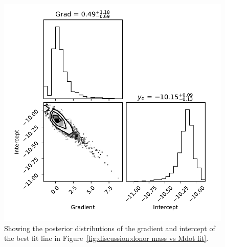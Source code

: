 \begin{figure}
    \centering
    \includegraphics[width=\textwidth]{figures/results/Mdot/Mr_Mdot-chopped_MCMC_both-errs_corner.pdf}
    \caption{Showing the posterior distributions of the gradient and intercept of the best fit line in Figure~\ref{fig:discussion:donor mass vs Mdot fit}.}
    \label{fig:discussion:donor mass vs Mdot corner}
\end{figure}



